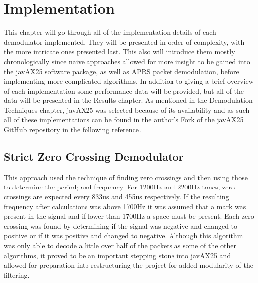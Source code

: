 \chapter{Implementation}

This chapter will go through all of the implementation details of each demodulator implemented. They will be presented in order of complexity, with the more intricate ones presented last. This also will introduce them mostly chronologically since naive approaches allowed for more insight to be gained into the javAX25 software package, as well as APRS packet demodulation, before implementing more complicated algorithms. In addition to giving a brief overview of each implementation some performance data will be provided, but all of the data will be presented in the Results chapter. As mentioned in the Demodulation Techniques chapter, javAX25 was selected because of its availability and as such all of these implementations can be found in the author's Fork of the javAX25 GitHub repository in the following reference\,\cite{myJavAX25}. 

\section{Strict Zero Crossing Demodulator}
This approach used the technique of finding zero crossings and then using those to determine the period; and frequency. For 1200Hz and 2200Hz tones, zero crossings are expected every 833us and 455us respectively. If the resulting frequency after calculations was above 1700Hz it was assumed that a mark was present in the signal and if lower than 1700Hz a space must be present. Each zero crossing was found by determining if the signal was negative and changed to positive or if it was positive and changed to negative. Although this algorithm was only able to decode a little over half of the packets as some of the other algorithms, it proved to be an important stepping stone into javAX25 and allowed for preparation into restructuring the project for added modularity of the filtering. 

